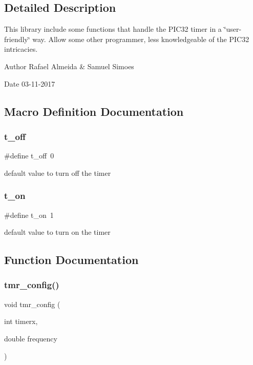 \subsection{Detailed Description}
This library include some functions that handle the P\+I\+C32 timer in a \char`\"{}user-\/friendly\char`\"{} way. Allow some other programmer, less knowledgeable of the P\+I\+C32 intricacies. 

\begin{DoxyAuthor}{Author}
Rafael Almeida \& Samuel Simoes
\end{DoxyAuthor}
\begin{DoxyDate}{Date}
03-\/11-\/2017 
\end{DoxyDate}


\subsection{Macro Definition Documentation}
\mbox{\label{_timer__libs_8h_ad65c41583d626847ad8f09241e0c8b34}} 
\subsubsection{t\+\_\+off}
{\footnotesize\ttfamily \#define t\+\_\+off~0}

default value to turn off the timer \mbox{\label{_timer__libs_8h_a7926fbf79225fd0d715515b5756c9f3d}} 
\subsubsection{t\+\_\+on}
{\footnotesize\ttfamily \#define t\+\_\+on~1}

default value to turn on the timer 

\subsection{Function Documentation}
\mbox{\label{_timer__libs_8h_ac95fce70764ad4bfdd4f0e66d23ed791}} 
\subsubsection{tmr\+\_\+config()}
{\footnotesize\ttfamily void tmr\+\_\+config (\begin{DoxyParamCaption}\item[{int}]{timerx,  }\item[{double}]{frequency }\end{DoxyParamCaption})}



